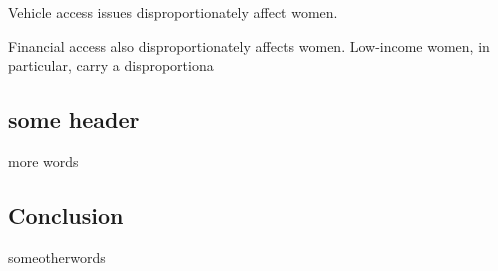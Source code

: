 \documentclass[
  12pt,
]{article}
\begin{document}
\begin{flushleft}
Vehicle access issues disproportionately affect women. 

Financial access also disproportionately
affects women. Low-income women, in
particular, carry a disproportiona

\end{flushleft}

\hypertarget{some-header}{%
\subsection{some header}\label{some-header}}

\begin{flushleft}
more words
\end{flushleft}

\subsection{Conclusion}
\begin{flushleft}
someotherwords
\end{flushleft}

\fancyhead[L]{}
\end{document}
